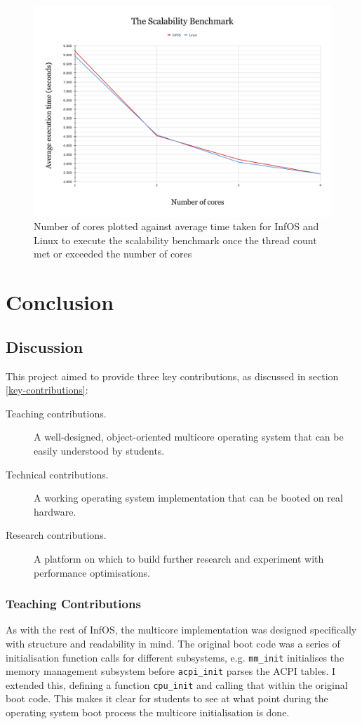 \documentclass[bsc,frontabs,singlespacing,parskip,deptreport]{infthesis}
\begin{document}
\begin{figure}[h]
    \centering
    \includegraphics[scale=0.3]{figures/scalability-graph.pdf}
    \caption{Number of cores plotted against average time taken for InfOS and Linux to execute the scalability benchmark once the thread count met or exceeded the number of cores}
    \label{scalability-graph}
\end{figure}

\chapter{Conclusion}
\section{Discussion}
This project aimed to provide three key contributions, as discussed in section \ref{key-contributions}:
\begin{description}
    \item [Teaching contributions.] A well-designed, object-oriented multicore operating system that can be easily understood by students.
    \item [Technical contributions.] A working operating system implementation that can be booted on real hardware.
    \item [Research contributions. ] A platform on which to build further research and experiment with performance optimisations.
\end{description}

\subsection{Teaching Contributions}
As with the rest of InfOS, the multicore implementation was designed specifically with structure and readability in mind. The original boot code was a series of initialisation function calls for different subsystems, e.g. \verb|mm_init| initialises the memory management subsystem before \verb|acpi_init| parses the ACPI tables. I extended this, defining a function \verb|cpu_init| and calling that within the original boot code. This makes it clear for students to see at what point during the operating system boot process the multicore initialisation is done.
\end{document}
